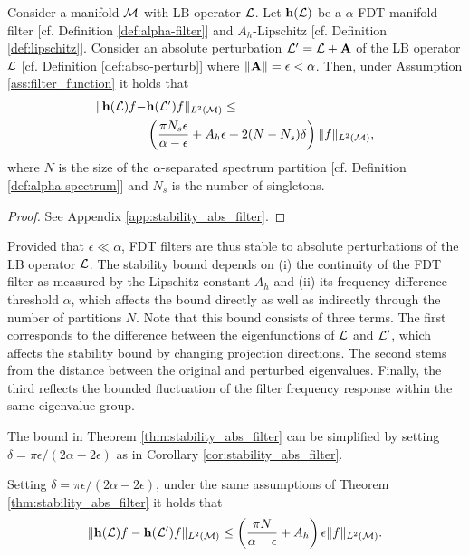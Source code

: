 \begin{theorem}\label{thm:stability_abs_filter}
Consider a manifold ${\mathcal M}$ with LB operator ${\mathcal L}$. Let ${\mathbf h}({\mathcal L})$ be a $\alpha$-FDT manifold filter [cf. Definition \ref{def:alpha-filter}] and $A_h$-Lipschitz [cf. Definition \ref{def:lipschitz}]. 
Consider an absolute perturbation ${\mathcal L}'={\mathcal L} + {\mathbf A}$ of the LB operator ${\mathcal L}$ [cf. Definition \ref{def:abso-perturb}] where $\|{\mathbf A}\| = \epsilon < \alpha$. Then, under Assumption \ref{ass:filter_function} it holds that
 \begin{align}\label{eqn:stability_nn}
    \nonumber\|{\mathbf h}({\mathcal L})f-& {\mathbf h}({\mathcal L}')f\|_{L^2({\mathcal M})} \leq \\& \left(\frac{\pi N_s \epsilon}{\alpha-\epsilon}+A_h\epsilon+ 2(N-N_s)\delta\right) \|f\|_{L^2({\mathcal M})},
 \end{align}
{where $N$ is the size of the $\alpha$-separated spectrum partition [cf. Definition \ref{def:alpha-spectrum}] and $N_s$ is the number of singletons.}
\end{theorem}
\begin{proof}
See Appendix \ref{app:stability_abs_filter}.
\end{proof}

Provided that $\epsilon \ll \alpha$, FDT filters are thus stable to absolute perturbations of the LB operator ${\mathcal L}$. The stability bound
depends on (i) the continuity of the FDT filter as measured by the Lipschitz constant $A_h$ and (ii) its frequency difference threshold $\alpha$, which affects the bound directly as well as indirectly through the number of partitions $N$. Note that this bound consists of three terms. The first corresponds to
the difference between the eigenfunctions of ${\mathcal L}$ and ${\mathcal L}'$, which affects the stability bound by changing projection directions. The second stems from the distance between the original and perturbed eigenvalues. Finally, the third reflects the bounded fluctuation of the filter frequency response within the same eigenvalue group.

The bound in Theorem \ref{thm:stability_abs_filter} can be simplified by setting $\delta=\pi\epsilon/(2\alpha-2\epsilon)$ as in Corollary \ref{cor:stability_abs_filter}.

\begin{corollary}\label{cor:stability_abs_filter}
Setting $\delta=\pi\epsilon/(2\alpha-2\epsilon)$, under the same assumptions of Theorem \ref{thm:stability_abs_filter} it holds that
\begin{align}\label{eqn:stability_abs_filter_cor}
    \|{\mathbf h}({\mathcal L})f-{\mathbf h}({\mathcal L}')f\|_{L^2({\mathcal M})} \leq  \left(\frac{\pi N}{\alpha-\epsilon}+A_h\right)\epsilon \|f\|_{L^2({\mathcal M})}.
 \end{align}
\end{corollary}

